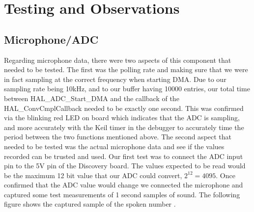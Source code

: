 \section{Testing and Observations}

\subsection{Microphone/ADC}
Regarding microphone data, there were two aspects of this component that needed to be tested. The first was the polling rate and making sure that we were in fact sampling at the correct frequency when starting DMA. Due to our sampling rate being 10kHz, and to our buffer having 10000 entries, our total time between HAL\_ADC\_Start\_DMA and the callback of the HAL\_ConvCmplCallback needed to be exactly one second. This was confirmed via the blinking red LED on board which indicates that the ADC is sampling, and more accurately with the Keil timer in the debugger to accurately time the period between the two functions mentioned above. The second aspect that needed to be tested was the actual microphone data and see if the values recorded can be trusted and used. Our first test was to connect the ADC input pin to the 5V pin of the Discovery board. The values expected to be read would be the maximum 12 bit value that our ADC could convert, $2^{12} = 4095$. Once confirmed that the ADC value would change we connected the microphone and captured some test measurements of 1 second samples of sound. The following figure shows the captured sample of the spoken number .

